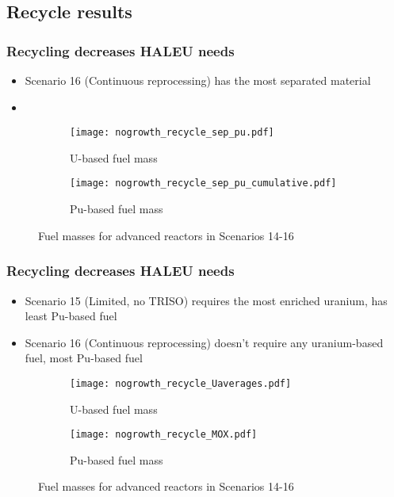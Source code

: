 \subsection{Recycle results}

\begin{frame}
    \frametitle{Recycling decreases HALEU needs}
    \begin{itemize}
        \item Scenario 16 (Continuous reprocessing) has the 
              most separated material 
        \item 
    \end{itemize}
    \begin{figure}
        \centering
        \begin{subfigure}{0.48\textwidth}
            \texttt{[image: nogrowth\_recycle\_sep\_pu.pdf]}
            \caption{U-based fuel mass}
        \end{subfigure}
        \hfill
        \begin{subfigure}{0.48\textwidth}
            \texttt{[image: nogrowth\_recycle\_sep\_pu\_cumulative.pdf]}
            \caption{Pu-based fuel mass}
        \end{subfigure}
        \caption{Fuel masses for advanced reactors in Scenarios 14-16}
        \label{fig:recycle_sep_pu}
    \end{figure}
\end{frame}

\begin{frame}
    \frametitle{Recycling decreases HALEU needs}
    \begin{itemize}
        \item Scenario 15 (Limited, no TRISO) requires the most 
              enriched uranium, has least Pu-based fuel
        \item Scenario 16 (Continuous reprocessing) doesn't 
              require any uranium-based fuel, most Pu-based fuel
    \end{itemize}
    \begin{figure}
        \centering
        \begin{subfigure}{0.48\textwidth}
            \texttt{[image: nogrowth\_recycle\_Uaverages.pdf]}
            \caption{U-based fuel mass}
        \end{subfigure}
        \hfill
        \begin{subfigure}{0.48\textwidth}
            \texttt{[image: nogrowth\_recycle\_MOX.pdf]}
            \caption{Pu-based fuel mass}
        \end{subfigure}
        \caption{Fuel masses for advanced reactors in Scenarios 14-16}
        \label{fig:recycle_fuel}
    \end{figure}
\end{frame}